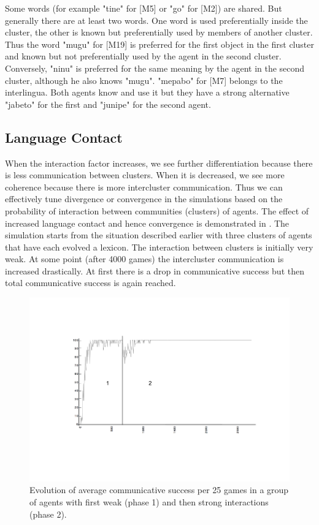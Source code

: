 Some words (for example "tine" for [M5] or "go" for [M2]) are
shared. But generally 
there are at least two words. One word is used preferentially inside the cluster,
the other is known but preferentially used by members of another cluster. Thus
the word "mugu" for [M19] is preferred for the first object in the first
cluster and known but not preferentially used by the agent in the second cluster.
Conversely, "ninu" is preferred for the same meaning by the agent in the second
cluster, although he also knows "mugu".
"mepabo" for [M7] belongs to the interlingua. Both agents
know and use it but they have a strong alternative "jabeto" for 
the first and "junipe" for the second agent. 

\subsection{Language Contact}

When the interaction factor increases, we see further differentiation because
there is less communication between clusters. When it is decreased, we see more
coherence because there is more intercluster communication. Thus we can
effectively tune divergence or convergence in the simulations
based on the probability of interaction
between communities (clusters) of agents. The effect of 
increased language contact and hence convergence is demonstrated in 
. 
The simulation starts from the situation described earlier with three 
clusters of agents that have each evolved a lexicon. 
The interaction between clusters is initially
very weak. At some point (after 4000 games) the intercluster communication is
increased drastically. At first there is a drop in communicative
success but then total communicative success is again reached.

\begin{figure}[htbp]
  \centerline{\includegraphics[width=.65\textwidth]{chap5/figs/comm-succ}}
\caption{\footnotesize Evolution of average communicative success per 25 games
in a group of agents with first weak (phase 1) and then strong
interactions (phase 2).}
\label{figure-communicative-success-in-space}
\end{figure}

